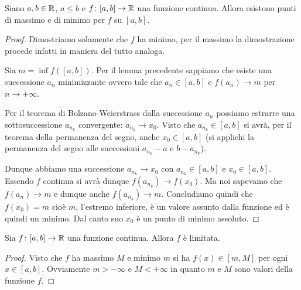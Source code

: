 \begin{theorem}[Weierstrass]%
\label{th:weierstrass}%
\mymark{***}%
%
%
%
%
Siano $a,b\in {\mathbb R}$, $a\le b$ e $f\colon [a,b]\to {\mathbb R}$ una funzione continua.
Allora esistono punti di massimo e di minimo per $f$ su $[a,b]$.
\end{theorem}
%
\begin{proof}
\mymark{***}%
Dimostriamo solamente che $f$ ha minimo, per il massimo la dimostrazione procede
infatti in maniera del tutto analoga.

Sia $m= \inf f([a,b])$.
Per il lemma precedente sappiamo che esiste una successione $a_n$ minimizzante ovvero tale che
$a_n \in [a,b]$ e $f(a_n)\to m$ per $n\to +\infty$.

Per il teorema di Bolzano-Weierstrass dalla successione $a_n$ possiamo estrarre una sottosuccessione 
$a_{n_k}$ convergente: $a_{n_k} \to x_0$.
Visto che $a_{n_k} \in [a,b]$ si avrà, per il teorema della permanenza del segno, anche 
$x_0 \in [a,b]$ (si applichi la permanenza del segno alle successioni $a_{n_k}-a$ e $b-a_{n_k}$).

Dunque abbiamo una successione $a_{n_k}\to x_0$ con $a_{n_k}\in [a,b]$ e
$x_0 \in [a,b]$. Essendo $f$ continua si avrà dunque $f(a_{n_k}) \to f(x_0)$.
Ma noi sapevamo che $f(a_n)\to m$ e dunque anche $f(a_{n_k}) \to m$.
Concludiamo quindi che $f(x_0) = m$ cioè $m$, l'estremo inferiore,
è un valore assunto dalla funzione ed è quindi un minimo.
Dal canto suo $x_0$ è un punto di minimo assoluto.
\end{proof}

\begin{corollary}
Sia $f\colon [a,b]\to {\mathbb R}$ una funzione continua. Allora $f$ è limitata.
\end{corollary}
\begin{proof}
Visto che $f$ ha massimo $M$ e minimo $m$ si ha $f(x)\in [m,M]$ per ogni $x\in[a,b]$.
Ovviamente $m>-\infty$ e $M<+\infty$ in quanto $m$ e $M$ sono valori della funzione $f$.
\end{proof}

